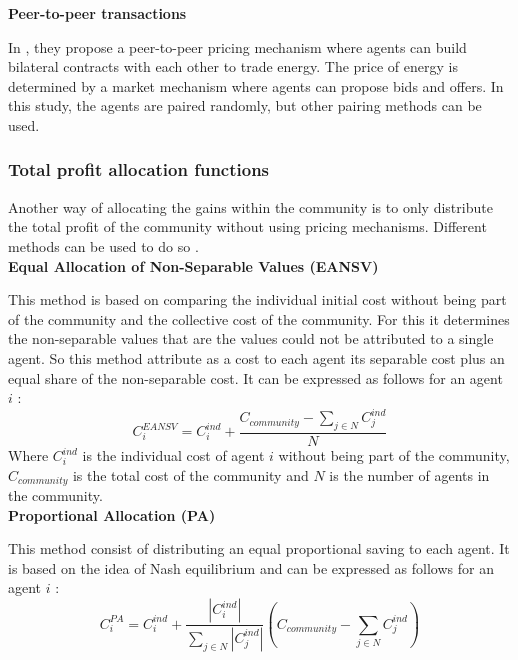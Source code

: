 \noindent\textbf{Peer-to-peer transactions}



In \cite{these_new}, they propose a peer-to-peer pricing mechanism where agents can build bilateral contracts with each other to trade energy. The price of energy is determined by a market mechanism where agents can propose bids and offers. In this study, the agents are paired randomly, but other pairing methods can be used.

\subsubsection{Total profit allocation functions}

Another way of allocating the gains within the community is to only distribute the total profit of the community without using pricing mechanisms. Different methods can be used to do so \cite{these_new, article_1}.
\\

\noindent\textbf{Equal Allocation of Non-Separable Values (EANSV)}

This method \cite{these_new} is based on comparing the individual initial cost without being part of the community and the collective cost of the community. For this it determines the non-separable values that are the values could not be attributed to a single agent. So this method attribute as a cost to each agent its separable cost plus an equal share of the non-separable cost. It can be expressed as follows for an agent $i$ :
\begin{equation}
    C_i^{EANSV} = C_i^{ind} + \frac{C_{community} - \sum\limits_{j \in N}{C_j^{ind}}}{N} 
\end{equation}
Where $C_i^{ind}$ is the individual cost of agent $i$ without being part of the community, $C_{community}$ is the total cost of the community and $N$ is the number of agents in the community.\\

\noindent\textbf{Proportional Allocation (PA)}

This method consist of distributing an equal proportional saving to each agent. It is based on the idea of Nash equilibrium and can be expressed as follows for an agent $i$ :
\begin{equation}
    C_i^{PA} = C_i^{ind} + \frac{|C_i^{ind}|}{\sum\limits_{j \in N}{|C_j^{ind}|}} (C_{community} - \sum\limits_{j \in N}{C_j^{ind}}) \label{eq:PA}
\end{equation}

